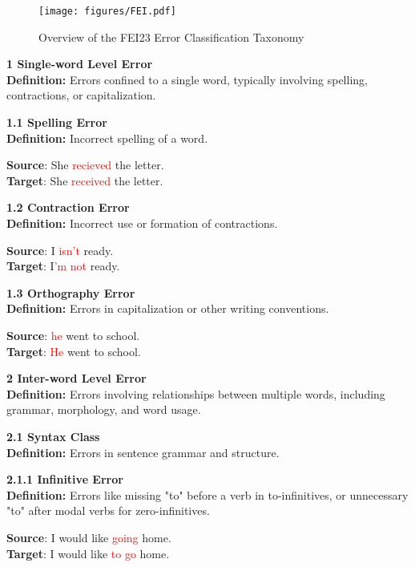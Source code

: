 \begin{figure*}[tb]
    \centering
    \texttt{[image: figures/FEI.pdf]}
    \caption{Overview of the FEI23 Error Classification Taxonomy}
    \label{fig:fei}
\end{figure*}

\begin{tcolorbox}[breakable]
\noindent \textbf{1 Single-word Level Error}\\
\textbf{Definition:} Errors confined to a single word, typically involving spelling, contractions, or capitalization.

\noindent \textbf{1.1 Spelling Error}\\
\textbf{Definition:} Incorrect spelling of a word.


\textbf{Source}: She \textcolor{red}{recieved} the letter. \\
\textbf{Target}: She \textcolor{red}{received} the letter.


\noindent \textbf{1.2 Contraction Error}\\
\textbf{Definition:} Incorrect use or formation of contractions.


\textbf{Source}: I \textcolor{red}{isn't} ready. \\
\textbf{Target}: I\textcolor{red}{'m not} ready.


\noindent \textbf{1.3 Orthography Error}\\
\textbf{Definition:} Errors in capitalization or other writing conventions.


\textbf{Source}: \textcolor{red}{he} went to school. \\
\textbf{Target}: \textcolor{red}{He} went to school.


\noindent \textbf{2 Inter-word Level Error}\\
\textbf{Definition:} Errors involving relationships between multiple words, including grammar, morphology, and word usage.

\noindent \textbf{2.1 Syntax Class}\\
\textbf{Definition:} Errors in sentence grammar and structure.

\noindent \textbf{2.1.1 Infinitive Error}\\
\textbf{Definition:} Errors like missing "to" before a verb in to-infinitives, or unnecessary "to" after modal verbs for zero-infinitives.


\textbf{Source}: I would like \textcolor{red}{going} home. \\
\textbf{Target}: I would like \textcolor{red}{to go} home.



\end{tcolorbox}

